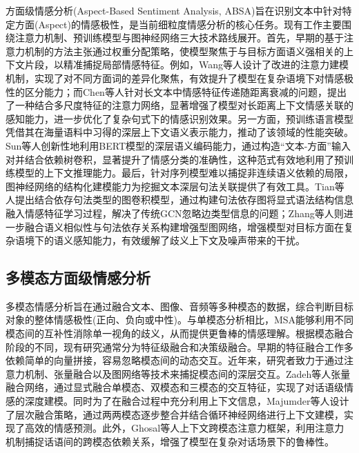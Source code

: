 方面级情感分析(Aspect-Based Sentiment Analysis, ABSA)旨在识别文本中针对特定方面(Aspect)的情感极性，是当前细粒度情感分析的核心任务。现有工作主要围绕注意力机制、预训练模型与图神经网络三大技术路线展开。首先，早期的基于注意力机制的方法主张通过权重分配策略，使模型聚焦于与目标方面语义强相关的上下文片段，以精准捕捉局部情感特征。例如，Wang等人设计了改进的注意力建模机制，实现了对不同方面词的差异化聚焦，有效提升了模型在复杂语境下对情感极性的区分能力\cite{wang2016attention}；而Chen等人针对长文本中情感特征传递随距离衰减的问题，提出了一种结合多尺度特征的注意力网络，显著增强了模型对长距离上下文情感关联的感知能力\cite{chen2017recurrent}，进一步优化了复杂句式下的情感识别效果。另一方面，预训练语言模型凭借其在海量语料中习得的深层上下文语义表示能力，推动了该领域的性能突破。Sun等人创新性地利用BERT模型的深层语义编码能力，通过构造“文本-方面”输入对并结合依赖树卷积，显著提升了情感分类的准确性\cite{sun2019utilizing}，这种范式有效地利用了预训练模型的上下文推理能力。最后，针对序列模型难以捕捉非连续语义依赖的局限，图神经网络的结构化建模能力为挖掘文本深层句法关联提供了有效工具。Tian等人提出结合依存句法类型的图卷积模型，通过构建句法依存图将显式语法结构信息融入情感特征学习过程，解决了传统GCN忽略边类型信息的问题\cite{wang2022aspect}；Zhang等人则进一步融合语义相似性与句法依存关系构建增强型图网络，增强模型对目标方面在复杂语境下的语义感知能力，有效缓解了歧义上下文及噪声带来的干扰\cite{yuan2022syntactic}。


\subsection{多模态方面级情感分析}
多模态情感分析旨在通过融合文本、图像、音频等多种模态的数据，综合判断目标对象的整体情感极性(正向、负向或中性)。与单模态分析相比，MSA能够利用不同模态间的互补性消除单一视角的歧义，从而提供更鲁棒的情感理解。根据模态融合阶段的不同，现有研究通常分为特征级融合和决策级融合。早期的特征融合工作多依赖简单的向量拼接，容易忽略模态间的动态交互。近年来，研究者致力于通过注意力机制、张量融合以及图网络等技术来捕捉模态间的深层交互。Zadeh等人张量融合网络，通过显式融合单模态、双模态和三模态的交互特征，实现了对话语级情感的深度建模\cite{zadeh2017tensor}。同时为了在融合过程中充分利用上下文信息，Majumder等人设计了层次融合策略，通过两两模态逐步整合并结合循环神经网络进行上下文建模，实现了高效的情感预测\cite{majumder2018multimodal}。此外，Ghosal等人上下文跨模态注意力框架，利用注意力机制捕捉话语间的跨模态依赖关系，增强了模型在复杂对话场景下的鲁棒性\cite{ghosal2018contextual}。


